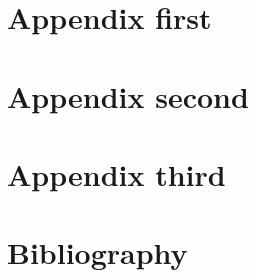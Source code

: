\documentclass[draft]{qx-files/qx-book}
\begin{document}
\appendix

\chapter{Appendix first}


\lipsum[1]

\chapter{Appendix second}


\lipsum[1]

\chapter{Appendix third}


\lipsum[1]

\backmatter

\chapter{Bibliography}

\lipsum
\end{document}
